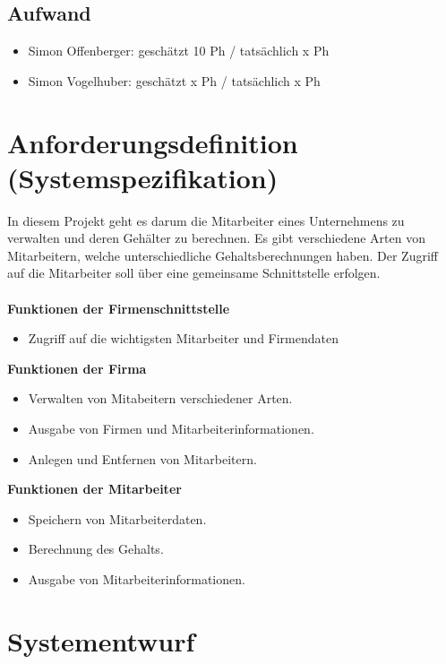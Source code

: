 \documentclass[12pt,naustrian,a4widepaper]{scrartcl}
\begin{document}
\subsection{Aufwand}
	
	\begin{itemize}
		\item Simon Offenberger: geschätzt 10 Ph / tatsächlich x Ph
		\item Simon Vogelhuber:  geschätzt x Ph / tatsächlich x Ph
	\end{itemize}

\clearpage
\section{Anforderungsdefinition (Systemspezifikation)}
In diesem Projekt geht es darum die Mitarbeiter eines Unternehmens zu verwalten und deren Gehälter zu berechnen.
Es gibt verschiedene Arten von Mitarbeitern, welche unterschiedliche Gehaltsberechnungen haben. Der Zugriff 
auf die Mitarbeiter soll über eine gemeinsame Schnittstelle erfolgen.
\\
\\
\textbf{Funktionen der Firmenschnittstelle}
\begin{itemize}
	\item Zugriff auf die wichtigsten Mitarbeiter und Firmendaten
\end{itemize}

\textbf{Funktionen der Firma}
\begin{itemize}
	\item Verwalten von Mitabeitern verschiedener Arten.
	\item Ausgabe von Firmen und Mitarbeiterinformationen.
	\item Anlegen und Entfernen von Mitarbeitern.
\end{itemize}

\textbf{Funktionen der Mitarbeiter}
\begin{itemize}
	\item Speichern von Mitarbeiterdaten.
	\item Berechnung des Gehalts.
	\item Ausgabe von Mitarbeiterinformationen.
\end{itemize}

\clearpage
\section{Systementwurf}
\end{document}
